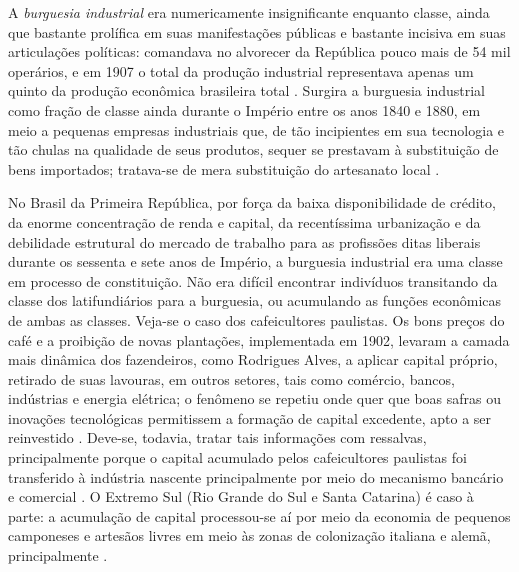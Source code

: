 A \textit{burguesia industrial} era numericamente insignificante enquanto classe, ainda que bastante prolífica em suas manifestações públicas e bastante incisiva em suas articulações políticas: comandava no alvorecer da República pouco mais de 54 mil operários, e em 1907 o total da produção industrial representava apenas um quinto da produção econômica brasileira total \cite[pp.~24-25]{gorender_burguesia_1990}. Surgira a burguesia industrial como fração de classe ainda durante o Império entre os anos 1840 e 1880, em meio a pequenas empresas industriais que, de tão incipientes em sua tecnologia e tão chulas na qualidade de seus produtos, sequer se prestavam à substituição de bens importados; tratava-se de mera substituição do artesanato local \cite[pp.~13-14]{gorender_burguesia_1990}. 

No Brasil da Primeira República, por força da baixa disponibilidade de crédito, da enorme concentração de renda e capital, da recentíssima urbanização e da debilidade estrutural do mercado de trabalho para as profissões ditas liberais durante os sessenta e sete anos de Império, a burguesia industrial era uma classe em processo de constituição. Não era difícil encontrar indivíduos transitando da classe dos latifundiários para a burguesia, ou acumulando as funções econômicas de ambas as classes. Veja-se o caso dos cafeicultores paulistas. Os bons preços do café e a proibição de novas plantações, implementada em 1902, levaram a camada mais dinâmica dos fazendeiros, como Rodrigues Alves, a aplicar capital próprio, retirado de suas lavouras, em outros setores, tais como comércio, bancos, indústrias e energia elétrica; o fenômeno se repetiu onde quer que boas safras ou inovações tecnológicas permitissem a formação de capital excedente, apto a ser reinvestido \cite[p.~147]{CARONE1970inst}. Deve-se, todavia, tratar tais informações com ressalvas, principalmente porque o capital acumulado pelos cafeicultores paulistas foi transferido à indústria nascente principalmente por meio do mecanismo bancário e comercial \cite[p.~38]{gorender_burguesia_1990}. O Extremo Sul (Rio Grande do Sul e Santa Catarina) é caso à parte: a acumulação de capital processou-se aí por meio da economia de pequenos camponeses e artesãos livres em meio às zonas de colonização italiana e alemã, principalmente \cite[p.~31]{gorender_burguesia_1990}.

